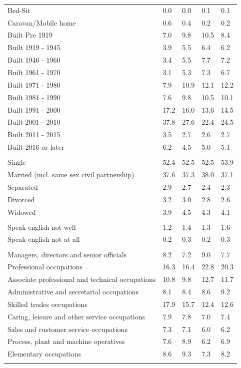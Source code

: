 \documentclass{article}
\begin{document}
\begin{table}[h]
\begin{tabular}{KTTTT}
Bed-Sit & 0.0& 0.0& 0.1& 0.1\\
Caravan/Mobile home & 0.6& 0.4& 0.2& 0.2\\
    \hline
Built Pre 1919 &  7.0&  9.8& 10.5&  8.4\\
Built 1919 - 1945 & 3.9& 5.5& 6.4& 6.2\\
Built  1946 - 1960 & 3.4& 5.5& 7.7& 7.2\\
Built  1961 - 1970 & 3.1& 5.3& 7.3& 6.7\\
Built  1971 - 1980 &  7.9& 10.9& 12.1& 12.2\\
Built  1981 - 1990 &  7.6&  9.8& 10.5& 10.1\\
Built  1991 - 2000 & 17.2& 16.0& 13.6& 14.5\\
Built  2001 - 2010 & 37.8& 27.6& 22.4& 24.5\\
Built  2011 - 2015 & 3.5& 2.7& 2.6& 2.7\\
Built  2016 or later & 6.2& 4.5& 5.0& 5.1\\
\hline
    \\
    \hline
Single & 52.4& 52.5& 52.5& 53.9\\
Married (incl. same sex civil partnership) & 37.6& 37.3& 38.0& 37.1\\
Separated  & 2.9& 2.7& 2.4& 2.3\\
Divorced  & 3.2& 3.0& 2.8& 2.6\\
Widowed & 3.9& 4.5& 4.3& 4.1\\
\hline
    \\ 
    \hline
Speak english not well & 1.2& 1.4& 1.3& 1.6\\
Speak english not at all & 0.2& 0.3& 0.2& 0.3\\
\hline
    \\
    \hline
Managers, directors and senior officials & 8.2& 7.2& 9.0& 7.7\\
Professional occupations & 16.3& 16.4& 22.8& 20.3\\
Associate professional and technical occupations & 10.8&  9.8& 12.7& 11.7\\
Administrative and secretarial occupations & 8.1& 8.4& 8.6& 9.2\\
Skilled trades occupations & 17.9& 15.7& 12.4& 12.6\\
Caring, leisure and other service occupations & 7.9& 7.8& 7.0& 7.4\\
Sales and customer service occupations & 7.3& 7.1& 6.0& 6.2\\
Process, plant and machine operatives & 7.6& 8.9& 6.2& 6.9\\
Elementary occupations & 8.6& 9.3& 7.3& 8.2\\
\hline
\end{tabular}
\end{table}
\end{document}

